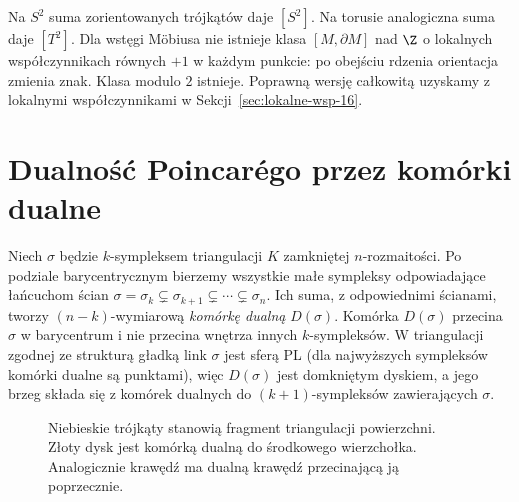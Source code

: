 \begin{przyklad}
Na $S^2$ suma zorientowanych
trójkątów daje $[S^2]$.
Na torusie analogiczna suma
daje $[T^2]$. Dla wstęgi
Möbiusa nie istnieje
klasa $[M,\partial M]$ nad $\Z$
o lokalnych współczynnikach
równych $+1$ w każdym punkcie:
po obejściu rdzenia orientacja
zmienia znak. Klasa modulo $2$
istnieje. Poprawną wersję
całkowitą uzyskamy z lokalnymi
współczynnikami w
Sekcji~\ref{sec:lokalne-wsp-16}.
\end{przyklad}

\section{Dualność Poincarégo przez komórki dualne}
\label{sec:dualnosc-komorkowa-16}

Niech $\sigma$ będzie $k$-sympleksem
triangulacji $K$ zamkniętej
$n$-rozmaitości. Po podziale
barycentrycznym bierzemy wszystkie
małe sympleksy odpowiadające
łańcuchom ścian
$\sigma=\sigma_k\subsetneq
\sigma_{k+1}\subsetneq\cdots
\subsetneq\sigma_n$.
Ich suma, z odpowiednimi
ścianami, tworzy
$(n-k)$-wymiarową
\emph{komórkę dualną} $D(\sigma)$.
Komórka $D(\sigma)$ przecina
$\sigma$ w barycentrum i nie
przecina wnętrza innych
$k$-sympleksów. W triangulacji zgodnej ze strukturą gładką link
$\sigma$ jest sferą PL (dla najwyższych sympleksów
komórki dualne są punktami), więc
$D(\sigma)$ jest domkniętym
dyskiem, a jego brzeg składa
się z komórek dualnych do
$(k+1)$-sympleksów
zawierających $\sigma$.

\begin{figure}[htbp]
\centering
{}
\caption{Niebieskie trójkąty stanowią fragment
triangulacji powierzchni. Złoty dysk jest
komórką dualną do środkowego wierzchołka.
Analogicznie krawędź ma dualną krawędź
przecinającą ją poprzecznie.}
\label{fig:dualna-komorka-16}
\end{figure}

